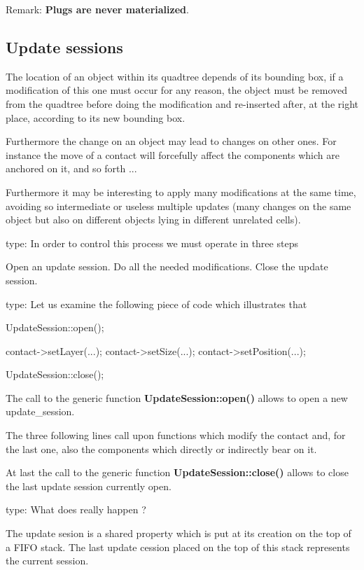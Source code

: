 \begin{DoxyParagraph}{Remark\+:}
{\bfseries Plugs are never materialized}.
\end{DoxyParagraph}
\hypertarget{classHurricane_1_1Go_secGoUpdateSessions}{}\subsection{Update sessions}\label{classHurricane_1_1Go_secGoUpdateSessions}
The location of an object within its quadtree depends of its bounding box, if a modification of this one must occur for any reason, the object must be removed from the quadtree before doing the modification and re-\/inserted after, at the right place, according to its new bounding box.

Furthermore the change on an object may lead to changes on other ones. For instance the move of a contact will forcefully affect the components which are anchored on it, and so forth ...

Furthermore it may be interesting to apply many modifications at the same time, avoiding so intermediate or useless multiple updates (many changes on the same object but also on different objects lying in different unrelated cells).

type\+: In order to control this process we must operate in three steps

Open an update session. Do all the needed modifications. Close the update session.

type\+: Let us examine the following piece of code which illustrates that 
\begin{DoxyCode}
UpdateSession::open();
 
contact->setLayer(...);
contact->setSize(...);
contact->setPosition(...);
 
UpdateSession::close();
\end{DoxyCode}
 The call to the generic function {\bfseries Update\+Session\+::open()} allows to open a new update\+\_\+session.

The three following lines call upon functions which modify the contact and, for the last one, also the components which directly or indirectly bear on it.

At last the call to the generic function {\bfseries Update\+Session\+::close()} allows to close the last update session currently open.

type\+: What does really happen ?

The update sesion is a shared property which is put at its creation on the top of a F\+I\+FO stack. The last update cession placed on the top of this stack represents the current session.


